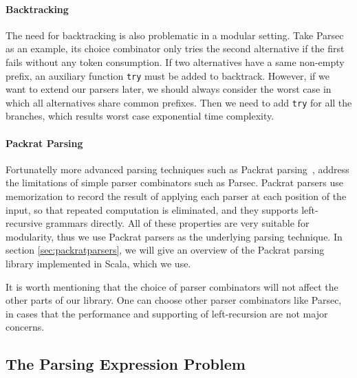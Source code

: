 \paragraph{Backtracking} The need for backtracking is also problematic
in a modular setting. Take Parsec as an example, its choice
combinator only tries the second alternative if the first fails
without any token consumption. If two alternatives have a same
non-empty prefix, an auxiliary function \lstinline{try} must be added
to backtrack. However, if we want to extend our parsers later, we
should always consider the worst case in which all alternatives share
common prefixes. Then we need to add \lstinline{try} for all the
branches, which results worst case exponential time complexity.

\paragraph{Packrat Parsing} 
Fortunatelly more advanced parsing techniques such as Packrat
parsing~\cite{}, address the limitations of simple parser combinators 
such as Parsec. Packrat parsers use
memorization to record the result of applying each parser at each
position of the input, so that repeated computation is eliminated, and
they supports left-recursive grammars directly. All of these properties are very
suitable for modularity, thus we use Packrat parsers as the underlying
parsing technique. In section \ref{sec:packratparsers}, we will give
an overview of the Packrat parsing library implemented in Scala, 
which we use.

It is worth mentioning that the choice of parser combinators will not
affect the other parts of our library. One can choose other parser
combinators like Parsec, in cases that the performance and supporting
of left-recursion are not major concerns. 

\subsection{The Parsing Expression Problem}

